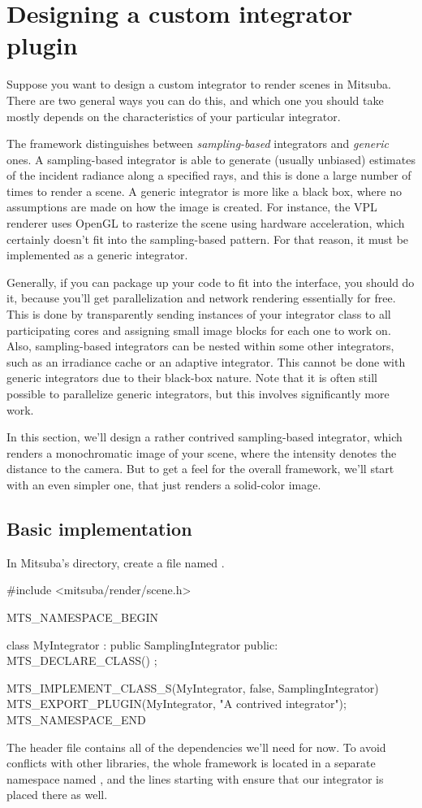 \section{Designing a custom integrator plugin}
Suppose you want to design a custom integrator to render scenes in Mitsuba.
There are two general ways you can do this, and which one you should take
mostly depends on the characteristics of your particular integrator.

The framework distinguishes between \emph{sampling-based} integrators and
\emph{generic} ones. A sampling-based integrator is able to generate
(usually unbiased) estimates of the incident radiance along a specified rays, and this
is done a large number of times to render a scene. A generic integrator
is more like a black box, where no assumptions are made on how the image is
created. For instance, the VPL renderer uses OpenGL to rasterize the scene
using hardware acceleration, which certainly doesn't fit into the sampling-based pattern.
For that reason, it must be implemented as a generic integrator.

Generally, if you can package up your code to fit into the
 interface, you should do it, because you'll get
parallelization and network rendering essentially for free. This is done
by transparently sending instances of your integrator class to all participating cores
and assigning small image blocks for each one to work on. Also, sampling-based
integrators can be nested within some other integrators, such as an
irradiance cache or an adaptive integrator. This cannot be done with generic
integrators due to their black-box nature. Note that it is often still
possible to parallelize generic integrators, but this involves significantly
more work.

In this section, we'll design a rather contrived sampling-based integrator,
which renders a monochromatic image of your scene, where the intensity
denotes the distance to the camera. But to get a feel for the overall
framework, we'll start with an even simpler one, that just renders a
solid-color image.

\subsection{Basic implementation}
In Mitsuba's  directory, create a file named
.

\begin{cpp}
#include <mitsuba/render/scene.h>

MTS_NAMESPACE_BEGIN

class MyIntegrator : public SamplingIntegrator {
public:
    MTS_DECLARE_CLASS()
};

MTS_IMPLEMENT_CLASS_S(MyIntegrator, false, SamplingIntegrator)
MTS_EXPORT_PLUGIN(MyIntegrator, "A contrived integrator");
MTS_NAMESPACE_END
\end{cpp}
The  header file contains all of the dependencies we'll need
for now.
To avoid conflicts with other libraries, the whole framework is located in
a separate namespace named , and the lines starting with
 ensure that our integrator is placed there
as well.

